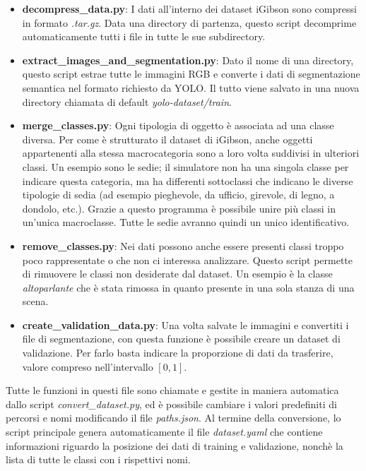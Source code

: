 \documentclass[12pt]{report}
\begin{document}
\begin{itemize}
	\item \textbf{decompress\_data.py}: I dati all'interno dei dataset iGibson sono compressi in formato \textit{.tar.gz}. Data una directory di partenza, questo script decomprime automaticamente tutti i file in tutte le sue subdirectory.
	
	\item \textbf{extract\_images\_and\_segmentation.py}: Dato il nome di una directory, questo script estrae tutte le immagini RGB e converte i dati di segmentazione semantica nel formato richiesto da YOLO. Il tutto viene salvato in una nuova directory chiamata di default \textit{yolo-dataset/train}.
	
	\item \textbf{merge\_classes.py}: Ogni tipologia di oggetto è associata ad una classe diversa. Per come è strutturato il dataset di iGibson, anche oggetti appartenenti alla stessa macrocategoria sono a loro volta suddivisi in ulteriori classi. Un esempio sono le sedie; il simulatore non ha una singola classe per indicare questa categoria, ma ha differenti sottoclassi che indicano le diverse tipologie di sedia (ad esempio pieghevole, da ufficio, girevole, di legno, a dondolo, etc.). Grazie a questo programma è possibile unire più classi in un'unica macroclasse. Tutte le sedie avranno quindi un unico identificativo.
	
	\item \textbf{remove\_classes.py}: Nei dati possono anche essere presenti classi troppo poco rappresentate o che non ci interessa analizzare. Questo script permette di rimuovere le classi non desiderate dal dataset. Un esempio è la classe \textit{altoparlante} che è stata rimossa in quanto presente in una sola stanza di una scena.
	
	\item \textbf{create\_validation\_data.py}: Una volta salvate le immagini e convertiti i file di segmentazione, con questa funzione è possibile creare un dataset di validazione. Per farlo basta indicare la proporzione di dati da trasferire, valore compreso nell'intervallo $[0, 1]$.
\end{itemize}

Tutte le funzioni in questi file sono chiamate e gestite in maniera automatica dallo script \textit{convert\_dataset.py}, ed è possibile cambiare i valori predefiniti di percorsi e nomi modificando il file \textit{paths.json}. Al termine della conversione, lo script principale genera automaticamente il file \textit{dataset.yaml} che contiene informazioni riguardo la posizione dei dati di training e validazione, nonchè la lista di tutte le classi con i rispettivi nomi.
\end{document}
